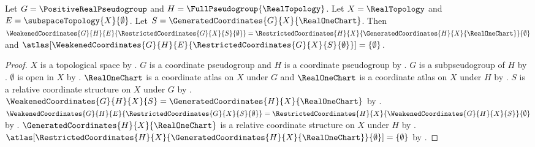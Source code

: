 \begin{theorem}\label{closed_empty_weakening_consumer}
    Let $G=\PositiveRealPseudogroup$ and $H=\FullPseudogroup{\RealTopology}$.
    Let $X=\RealTopology$ and $E=\subspaceTopology{X}{\emptyset}$.
    Let $S=\GeneratedCoordinates{G}{X}{\RealOneChart}$.
    Then $\WeakenedCoordinates{G}{H}{E}{\RestrictedCoordinates{G}{X}{S}{\emptyset}}
        =\RestrictedCoordinates{H}{X}{\GeneratedCoordinates{H}{X}{\RealOneChart}}{\emptyset}$ and
        $\atlas[\WeakenedCoordinates{G}{H}{E}{\RestrictedCoordinates{G}{X}{S}{\emptyset}}]=\{\emptyset\}$.
\end{theorem}
\begin{proof}
    $X$ is a topological space by .
    $G$ is a coordinate pseudogroup and $H$ is a coordinate pseudogroup by
        .
    $G$ is a subpseudogroup of $H$ by .
    $\emptyset$ is open in $X$ by .
    $\RealOneChart$ is a coordinate atlas on $X$ under $G$ and
        $\RealOneChart$ is a coordinate atlas on $X$ under $H$ by
        .
    $S$ is a relative coordinate structure on $X$ under $G$ by .
    $\WeakenedCoordinates{G}{H}{X}{S}=\GeneratedCoordinates{H}{X}{\RealOneChart}$ by
        .
    $\WeakenedCoordinates{G}{H}{E}{\RestrictedCoordinates{G}{X}{S}{\emptyset}}
        =\RestrictedCoordinates{H}{X}{\WeakenedCoordinates{G}{H}{X}{S}}{\emptyset}$ by
        .
    $\GeneratedCoordinates{H}{X}{\RealOneChart}$ is a relative coordinate structure on $X$ under $H$ by
        .
    $\atlas[\RestrictedCoordinates{H}{X}{\GeneratedCoordinates{H}{X}{\RealOneChart}}{\emptyset}]=\{\emptyset\}$ by
        .
\end{proof}
